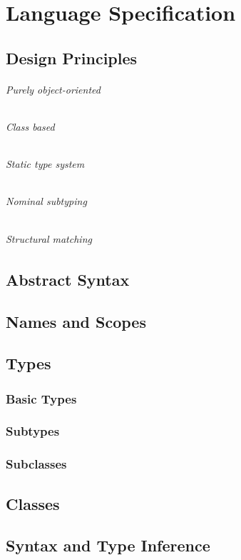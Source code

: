 \part{Language Specification}
\chapter{Design Principles}
\cite{gawecki_tool:_1995}
\paragraph{Purely object-oriented}
\paragraph{Class based}
\paragraph{Static type system}
\paragraph{Nominal subtyping}
\paragraph{Structural matching}


\chapter{Abstract Syntax}

\chapter{Names and Scopes}

\chapter{Types}
\section{Basic Types}
\section{Subtypes}
\section{Subclasses}

\chapter{Classes}

\chapter{Syntax and Type Inference}
